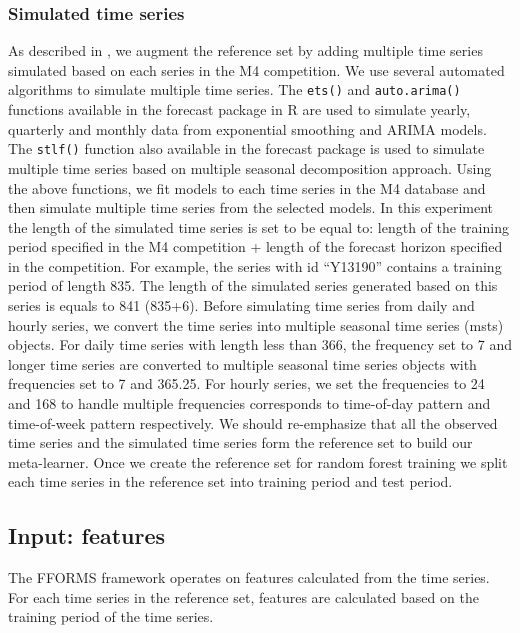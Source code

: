 \documentclass[11pt,a4paper,]{article}
\begin{document}
\hypertarget{simulated-time-series}{%
\subsubsection{Simulated time series}\label{simulated-time-series}}

As described in \textcite{fforms}, we augment the reference set by adding multiple time series simulated based on each series in the M4 competition. We use several automated algorithms to simulate multiple time series. The \texttt{ets()} and \texttt{auto.arima()} functions available in the forecast package in R \autocite{forecast} are used to simulate yearly, quarterly and monthly data from exponential smoothing and ARIMA models. The \texttt{stlf()} function also available in the forecast package is used to simulate multiple time series based on multiple seasonal decomposition approach. Using the above functions, we fit models to each time series in the M4 database and then simulate multiple time series from the selected models. In this experiment the length of the simulated time series is set to be equal to: length of the training
period specified in the M4 competition + length of the forecast horizon specified in the competition. For example, the series with id ``Y13190'' contains a training period of length 835. The length of the simulated series generated based on this series is equals to 841 (835+6). Before simulating time series from daily and hourly series, we convert the time series into multiple seasonal time series (msts) objects. For daily time series with length less than 366, the frequency set to 7 and longer time series are converted to multiple seasonal time series objects with frequencies set to 7 and 365.25. For hourly series, we set the frequencies to 24 and 168 to handle multiple frequencies corresponds to time-of-day pattern and time-of-week pattern respectively. We should re-emphasize that all the observed time series and the simulated time series form the reference set to build our meta-learner. Once we create the reference set for random forest training we split each time series in the reference set into training period and test period.

\hypertarget{input-features}{%
\subsection{Input: features}\label{input-features}}

The FFORMS framework operates on features calculated from the time series. For each time series in the reference set, features are calculated based on the training period of the time series.
\end{document}
